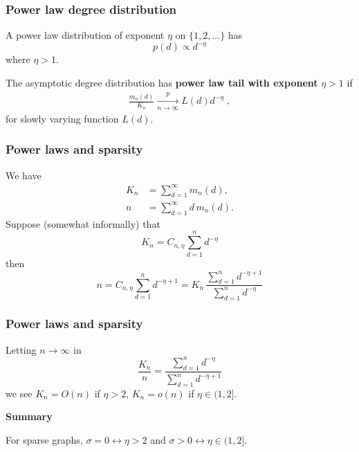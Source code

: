 \documentclass[final,hyperref={pdfpagelabels=false},noamsthm]{beamer}
\begin{document}
\begin{frame}
	\frametitle{Power law degree distribution}
	A power law distribution of exponent $\eta$ on $\{1, 2, ...\}$ has
	\begin{equation*}
	p(d) \propto d^{-\eta} 
	\end{equation*}
	where $\eta > 1$.
	
	\pause
	The asymptotic degree distribution has \textbf{power law tail with exponent} $\eta > 1$ if
	\begin{align} 
	\label{eq:plaw}
	\frac{m_{n}(d)}{K_n} \xrightarrow[n\to\infty]{p} L(d)d^{-\eta} \;,
	\end{align}
	for slowly varying function $L(d)$.
\end{frame}

\begin{frame}
	\frametitle{Power laws and sparsity}
	We have
	\begin{align*}
		K_n &= \sum_{d=1}^\infty m_n(d), \\
		n &= \sum_{d=1}^\infty d\, m_n(d).
	\end{align*}
	Suppose (somewhat informally) that
	\begin{equation*}
		K_n = C_{n, \eta} \sum_{d=1}^n d^{-\eta}
	\end{equation*}
	\pause
	then 
	\begin{equation*}	
	n = C_{n, \eta} \sum_{d=1}^n d^{-\eta + 1} = K_n \, \frac{\sum_{d=1}^n d^{-\eta + 1}}{\sum_{d=1}^n d^{-\eta}}
	\end{equation*}
\end{frame}

\begin{frame}
	\frametitle{Power laws and sparsity}
	Letting $n\to \infty$ in
	\begin{equation*}
		\frac{K_n}{n} = \frac{\sum_{d=1}^n d^{-\eta}}{\sum_{d=1}^n d^{-\eta + 1}}
	\end{equation*}
	we see $K_n = O(n)$ if $\eta > 2$, $K_n = o(n)$ if $\eta \in (1, 2]$.
	\vspace{40pt}
	\pause
	
	\textbf{Summary}
	
	For sparse graphs, $\sigma=0 \leftrightarrow \eta > 2$ and $\sigma > 0 \leftrightarrow \eta \in (1,2]$.
\end{frame}
\end{document}
